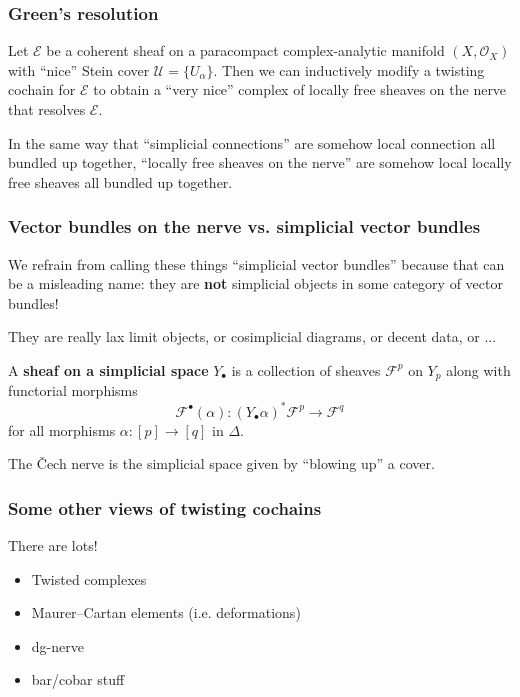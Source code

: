 \documentclass{beamer}
\begin{document}
  \begin{frame}\frametitle{Green's resolution}
    \begin{theorem}[Green, 1980]
      Let $\mathscr{E}$ be a coherent sheaf on a paracompact complex-analytic manifold $(X,\mathcal{O}_X)$ with ``nice'' Stein cover $\mathscr{U}=\{U_\alpha\}$.
      Then we can inductively modify a twisting cochain for $\mathscr{E}$ to obtain a ``very nice'' complex of locally free sheaves on the nerve that resolves $\mathscr{E}$.
    \end{theorem}

    \pause

    In the same way that ``simplicial connections'' are somehow local connection all bundled up together, ``locally free sheaves on the nerve'' are somehow local locally free sheaves all bundled up together.
  \end{frame}

  \begin{frame}\frametitle{Vector bundles on the nerve vs. simplicial vector bundles}
    We refrain from calling these things ``simplicial vector bundles'' because that can be a misleading name: they are \textbf{not} simplicial objects in some category of vector bundles!

    \pause

    They are really lax limit objects, or cosimplicial diagrams, or decent data, or ...

    \pause

    \begin{definition}[Vague]
      A \textbf{sheaf on a simplicial space} $Y_\bullet$ is a collection of sheaves $\mathscr{F}^p$ on $Y_p$ along with functorial morphisms
      \[
        \mathscr{F}^\bullet(\alpha)\colon (Y_\bullet\alpha)^*\mathscr{F}^p \to \mathscr{F}^q
      \]
      for all morphisms $\alpha\colon[p]\to[q]$ in $\Delta$.
    \end{definition}

    The Čech nerve is the simplicial space given by ``blowing up'' a cover.
  \end{frame}

  \begin{frame}\frametitle{Some other views of twisting cochains}
    There are lots!
    \begin{itemize}
      \item Twisted complexes
      \item Maurer--Cartan elements (i.e. deformations)
      \item dg-nerve
      \item bar/cobar stuff
    \end{itemize}
  \end{frame}
\end{document}
